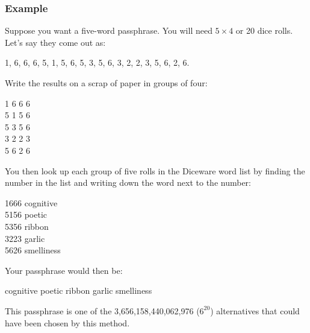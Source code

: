 \newpage

\subsubsection*{Example}

Suppose you want a five-word passphrase. You will need $5 \times 4$ or 20 dice rolls. Let's say they come out as:

1, 6, 6, 6, 5, 1, 5, 6, 5, 3, 5, 6, 3, 2, 2, 3, 5, 6, 2, 6. 

Write the results on a scrap of paper in groups of four:

1 6 6 6 \\
5 1 5 6 \\
5 3 5 6 \\
3 2 2 3 \\
5 6 2 6

You then look up each group of five rolls in the Diceware word list by finding the number in the list and writing down the word next to the number:

1666 cognitive \\
5156 poetic \\
5356 ribbon \\
3223 garlic \\
5626 smelliness

Your passphrase would then be:

cognitive poetic ribbon garlic smelliness

This passphrase is one of the 3,656,158,440,062,976 ($6^{20}$) alternatives that could have been chosen by this method.
